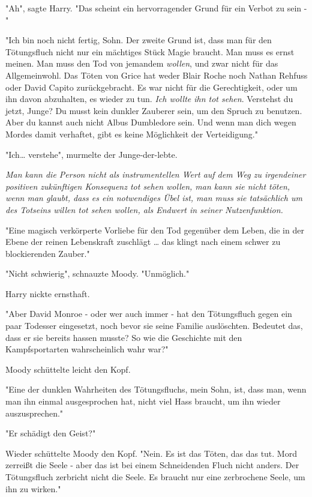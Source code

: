 {"Ah", sagte Harry. "Das scheint ein hervorragender Grund für ein Verbot zu sein -"

"Ich bin noch nicht fertig, Sohn. Der zweite Grund ist, dass man für den Tötungsfluch nicht nur ein mächtiges Stück Magie braucht. Man muss es ernst meinen. Man muss den Tod von jemandem \emph{wollen}, und zwar nicht für das Allgemeinwohl. Das Töten von Grice hat weder Blair Roche noch Nathan Rehfuss oder David Capito zurückgebracht. Es war nicht für die Gerechtigkeit, oder um ihn davon abzuhalten, es wieder zu tun. \emph{Ich wollte ihn tot sehen}. Verstehst du jetzt, Junge? Du musst kein dunkler Zauberer sein, um den Spruch zu benutzen. Aber du kannst auch nicht Albus Dumbledore sein. Und wenn man dich wegen Mordes damit verhaftet, gibt es keine Möglichkeit der Verteidigung."

"Ich… verstehe", murmelte der Junge-der-lebte.

\emph{Man kann die Person nicht als instrumentellen Wert auf dem Weg zu irgendeiner positiven zukünftigen Konsequenz tot sehen wollen, man kann sie nicht töten, wenn man glaubt, dass es ein notwendiges Übel ist, man muss sie tatsächlich um des Totseins willen tot sehen wollen, als Endwert in seiner Nutzenfunktion.}

"Eine magisch verkörperte Vorliebe für den Tod gegenüber dem Leben, die in der Ebene der reinen Lebenskraft zuschlägt … das klingt nach einem schwer zu blockierenden Zauber."

"Nicht schwierig", schnauzte Moody. "Unmöglich."

Harry nickte ernsthaft.

"Aber David Monroe - oder wer auch immer - hat den Tötungsfluch gegen ein paar Todesser eingesetzt, noch bevor sie seine Familie auslöschten. Bedeutet das, dass er sie bereits hassen musste? So wie die Geschichte mit den Kampfsportarten wahrscheinlich wahr war?"

Moody schüttelte leicht den Kopf.

"Eine der dunklen Wahrheiten des Tötungsfluchs, mein Sohn, ist, dass man, wenn man ihn einmal ausgesprochen hat, nicht viel Hass braucht, um ihn wieder auszusprechen."

"Er schädigt den Geist?"

Wieder schüttelte Moody den Kopf. "Nein. Es ist das Töten, das das tut. Mord zerreißt die Seele - aber das ist bei einem Schneidenden Fluch nicht anders. Der Tötungsfluch zerbricht nicht die Seele. Es braucht nur eine zerbrochene Seele, um ihn zu wirken."

}

